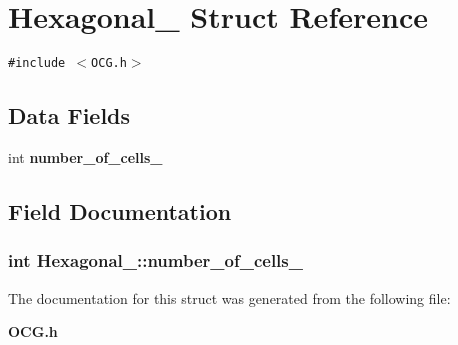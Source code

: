 \section{Hexagonal\_\- Struct Reference}
\label{structHexagonal__}
{\tt \#include $<$OCG.h$>$}

\subsection*{Data Fields}
\begin{CompactItemize}
\item 
int {\bf number\_\-of\_\-cells\_\-}
\end{CompactItemize}


\subsection{Field Documentation}
\subsubsection[{number\_\-of\_\-cells\_\-}]{\setlength{\rightskip}{0pt plus 5cm}int {\bf Hexagonal\_\-::number\_\-of\_\-cells\_\-}}\label{structHexagonal___28c88ddc6de5894e5c9895d41a5e3d10}




The documentation for this struct was generated from the following file:\begin{CompactItemize}
\item 
{\bf OCG.h}\end{CompactItemize}

